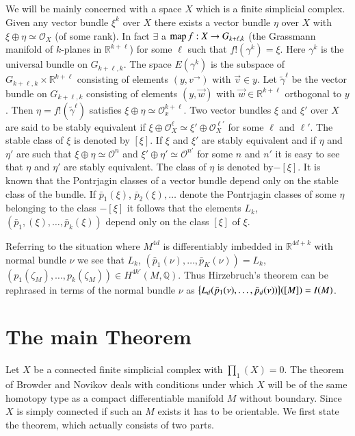\setcounter{subsection}{7}
\subsection{}\label{chap1:subsec1.8}%
\; We will be mainly concerned with a space $X$ which is a finite
simplicial complex. Given any vector bundle $\xi^k$ over $X$ there
exists a vector bundle $\eta$ over $X$ with $\xi \oplus \eta \simeq
\mathscr{O}_X $ (of some rank). In fact $\exists$ a $\operatorname{map} f : X \to
G_{k+\ell, k}$ (the Grassmann manifold of $k$-planes in
$\mathbb{R}^{k+\ell}$) for some $\ell$ such that $f! (\gamma^k) =
\xi$. Here $\gamma^k$ is the universal bundle on $G_{k+\ell, k}$. The
space $E(\gamma^k)$ is the subspace of $G_{k+\ell, k}
\times \mathbb{R}^{k+\ell}$ consisting of elements $(y, v^{\to})$ with 
$\overrightarrow{v}\in y$. Let $\tilde{\gamma}^\ell$ be the
vector bundle on 
$G_{k+\ell, k}$ consisting of elements $(y, \overrightarrow{w})$ with
$\overrightarrow{w} 
\in \mathbb{R}^{k+\ell}$ orthogonal to $y$. Then $\eta = f!
(\tilde{\gamma}^\ell)$ satisfies $\xi \oplus \eta \simeq
\mathscr{O}^{k+\ell}_x$. Two vector bundles $\xi$ and $\xi'$ over $X$ are
said to be stably equivalent if $\xi \oplus \mathscr{O}^\ell_X \simeq
\xi' \oplus \mathscr{O}^{\ell'}_X$ for some $\ell$ and $\ell'$. The stable
class of $\xi$ is denoted by $[\xi]$. If $\xi$ and $\xi'$ are stably
equivalent and if $\eta$ and $\eta'$ are such that $\xi \oplus \eta
\simeq \mathscr{O}^n$ and $\xi' \oplus \eta' \simeq \mathscr{O}^{n'}$
for some $n$ and $n'$ it is easy to see that $\eta$ and\pageoriginale
$\eta'$ are stably equivalent. The class of $\eta$ is denoted
by$-[\xi]$. It is known that the Pontrjagin classes of a vector bundle 
depend only on the stable class of the bundle. If $\bar{p}_1 (\xi)$,
$\bar{p}_2 (\xi),\ldots$ denote the Pontrjagin classes of some $\eta$
belonging to the class $-[\xi]$ it follows that the elements $L_k$,
$(\bar{p}_1,(\xi),\ldots, \bar{p}_k (\xi))$ depend only on the class
$[\xi]$ of $\xi$.  

 Referring to the situation where $M^{4d}$ is differentiably imbedded
 in $\mathbb{R}^{4d+k}$ with normal bundle $\nu$ we see that $L_k$,
 $(\bar{p}_1 (\nu), \ldots, \bar{p}_K (\nu )) = L_k$, $(p_1
 (\zeta_M), \ldots, p_k (\zeta_M)) \in H^{4k'} (M,
 \mathbb{Q})$. Thus Hirzebruch's theorem can be rephrased in terms of
 the normal bundle $\nu$ as $\big\{L_d (\bar{p}_1 (\nu), \ldots,
 \bar{p}_d (\nu))\big\}\break ([M]) = I (M)$. 
 

 \section{The main Theorem}\label{chap1:sec2}%
 Let $X$ be a connected finite simplicial complex with $\prod_1 (X)
 =0$. The theorem of Browder and Novikov deals with conditions under
 which $X$ will be of the same homotopy type as a compact
 differentiable manifold $M$ without boundary. Since $X$ is simply
 connected if such an $M$ exists it has to be orientable. We first
 state the theorem, which actually consists of two parts.  
 
